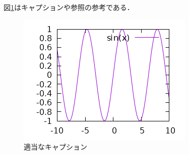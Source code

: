 \documentclass[lualatex]{jlreq}
\begin{document}
	図\ref{fig:sample}はキャプションや参照の参考である．
	\begin{figure}[htbp]
		\centering
		\includegraphics[width=.7\columnwidth]{sample1.png}
		\caption{適当なキャプション}
		\label{fig:sample}
	\end{figure}
\end{document}
